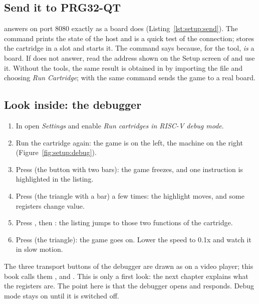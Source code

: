 \subsection{Send it to PRG32-QT}

\prgqt answers on port 8080 exactly as a board does
(Listing~\ref{lst:setup:send}). The command  prints the state of
the host and is a quick test of the connection;  stores
the cartridge in a slot and starts it. The command says 
because, for the tool, \prgqt \emph{is} a board. If  does not
answer, read the address shown on the Setup screen of \prgqt and use it.
Without the tools, the same result is obtained in \prgqt by importing the file
 and choosing \emph{Run Cartridge}; with
 the same command sends the game to a real
board.


\subsection{Look inside: the debugger}

\begin{prgtry}
\begin{enumerate}[nosep]
\item In \prgqt open \emph{Settings} and enable \emph{Run cartridges in RISC-V
  debug mode}.
\item Run the cartridge again: the game is on the left, the machine on the
  right (Figure~\ref{fig:setup:debug}).
\item Press  (the button with two bars): the game freezes, and one
  instruction is highlighted in the listing.
\item Press  (the triangle with a bar) a few times: the highlight
  moves, and some registers change value.
\item Press , then : the listing jumps to those two
  functions of the cartridge.
\item Press  (the triangle): the game goes on. Lower the speed to
  0.1x and watch it in slow motion.
\end{enumerate}
\end{prgtry}

The three transport buttons of the debugger are drawn as on a video player;
this book calls them ,  and .
This is only a first look: the next chapter explains what the registers are.
The point here is that the debugger opens and responds. Debug mode stays on
until it is switched off.

